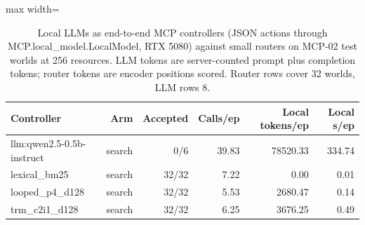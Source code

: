\begin{table}[t]
\centering
\small
\begin{adjustbox}{max width=\linewidth}
\begin{tabular}{lrrrrr}
\toprule
Controller & Arm & Accepted & Calls/ep & Local tokens/ep & Local s/ep \\
\midrule
llm:qwen2.5-0.5b-instruct & search & 0/6 & 39.83 & 78520.33 & 334.74 \\
lexical\_bm25 & search & 32/32 & 7.22 & 0.00 & 0.01 \\
looped\_p4\_d128 & search & 32/32 & 5.53 & 2680.47 & 0.14 \\
trm\_c2i1\_d128 & search & 32/32 & 6.25 & 3676.25 & 0.49 \\
\bottomrule
\end{tabular}
\end{adjustbox}
\caption{Local LLMs as end-to-end MCP controllers (JSON actions through MCP.local\_model.LocalModel, RTX 5080) against small routers on MCP-02 test worlds at 256 resources. LLM tokens are server-counted prompt plus completion tokens; router tokens are encoder positions scored. Router rows cover 32 worlds, LLM rows 8.}
\label{tab:llm-controllers}
\end{table}
